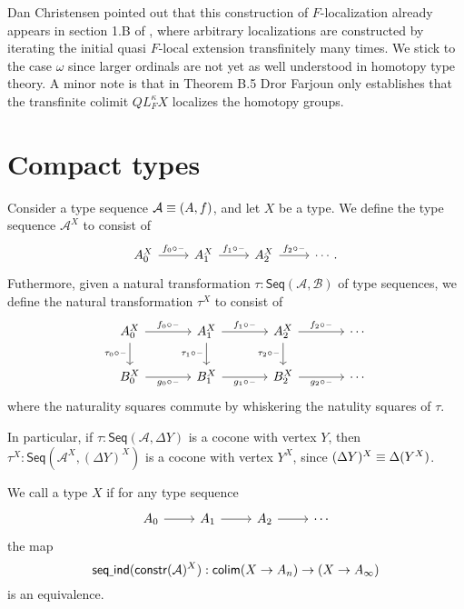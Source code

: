 Dan Christensen pointed out that this construction of $F$-localization already appears in section 1.B of \cite{DrorFarjoun}, where arbitrary localizations are constructed by iterating the initial quasi $F$-local extension transfinitely many times. We stick to the case $\omega$ since larger ordinals are not yet as well understood in homotopy type theory. A minor note is that in Theorem B.5 Dror Farjoun only establishes that the transfinite colimit $QL_F^\kappa X$ localizes the homotopy groups.

\section{Compact types}

\begin{defn}
Consider a type sequence $\mathcal{A}\equiv (A,f)$, and let $X$ be a type. We define the type sequence $\mathcal{A}^X$ to consist of
\begin{equation*}
\begin{tikzcd}
A_0^X \arrow[r,"f_0\circ \blank"] & A_1^X \arrow[r,"f_1\circ\blank"] & A_2^X \arrow[r,"f_2\circ\blank"] & \cdots. 
\end{tikzcd}
\end{equation*}
Futhermore, given a natural transformation $\tau:\mathsf{Seq}(\mathcal{A},\mathcal{B})$ of type sequences, we define the natural transformation $\tau^X$ to consist of
\begin{equation*}
\begin{tikzcd}[column sep=large]
A_0^X \arrow[r,"f_0\circ \blank"] \arrow[d,swap,"\tau_0\circ\blank"] & A_1^X \arrow[r,"f_1\circ\blank"] \arrow[d,swap,"\tau_1\circ\blank"] & A_2^X \arrow[r,"f_2\circ\blank"] \arrow[d,swap,"\tau_2\circ\blank"] & \cdots \\
B_0^X \arrow[r,swap,"g_0\circ \blank"] & B_1^X \arrow[r,swap,"g_1\circ\blank"] & B_2^X \arrow[r,swap,"g_2\circ\blank"] & \cdots
\end{tikzcd}
\end{equation*}
where the naturality squares commute by whiskering the natulity squares of $\tau$. 
\end{defn}

In particular, if $\tau:\mathsf{Seq}(\mathcal{A},\Delta Y)$ is a cocone with vertex $Y$, then $\tau^X :\mathsf{Seq}(\mathcal{A}^X,(\Delta Y)^X)$ is a cocone with vertex $Y^X$, since $(\Delta Y)^X \equiv \Delta (Y^X)$.  

\begin{defn}
We call a type $X$  if for any type sequence
\begin{equation*}
\begin{tikzcd}
A_0 \arrow[r] & A_1 \arrow[r] & A_2 \arrow[r] & \cdots
\end{tikzcd}
\end{equation*}
the map
\begin{equation*}
\mathsf{seq\underline{\ }{}ind}(\mathsf{constr}(\mathcal{A})^X)
  : \mathsf{colim}(X\to A_n)\to(X\to A_\infty)
\end{equation*}
is an equivalence.
\end{defn}

